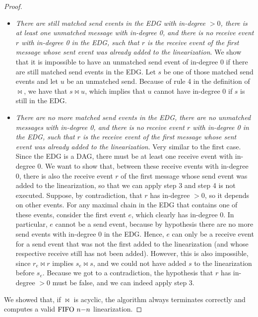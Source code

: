 \begin{proof}
\begin{itemize}
	\item \emph{There are still matched send events in the EDG with in-degree $>0$, there is at least one unmatched message with in-degree 0, and there is no receive event $r$ with in-degree 0 in the EDG, such that $r$ is the receive event of the first message whose sent event was already added to the linearization}. We show that it is impossible to have an unmatched send event of in-degree 0 if there are still matched send events in the EDG. Let $s$ be one of those matched send events and let $u$ be an unmatched send. Because of rule 4 in the definition of $\bowtie$, we have that $s \bowtie u$, which implies that $u$ cannot have in-degree 0 if $s$ is still in the EDG.
	\item \emph{There are no more matched send events in the EDG, there are no unmatched messages with in-degree 0, and there is no receive event $r$ with in-degree 0 in the EDG, such that $r$ is the receive event of the first message whose sent event was already added to the linearization}. Very similar to the first case. Since the EDG is a DAG, there must be at least one receive event with in-degree 0. We want to show that, between these receive events with in-degree 0, there is also the receive event $r$ of the first message whose send event was added to the linearization, so that we can apply step 3 and step 4 is not executed. Suppose, by contradiction, that $r$ has in-degree $>0$, so it depends on other events. For any maximal chain in the EDG that contains one of these events, consider the first event $e$, which clearly has in-degree 0. In particular, $e$ cannot be a send event, because by hypothesis there are no more send events with in-degree 0 in the EDG. Hence, $e$ can only be a receive event for a send event that was not the first added to the linearization (and whose respective receive still has not been added). However, this is also impossible, since $r_e \bowtie r$ implies $s_e \bowtie s$, and we could not have added $s$ to the linearization before $s_e$. Because we got to a contradiction, the hypothesis that $r$ has in-degree $>0$ must be false, and we can indeed apply step 3.
\end{itemize}
We showed that, if $\bowtie$ is acyclic, the algorithm always terminates correctly and computes a valid $\text{FIFO } n\mathsf{-}n$ linearization.
\end{proof}
